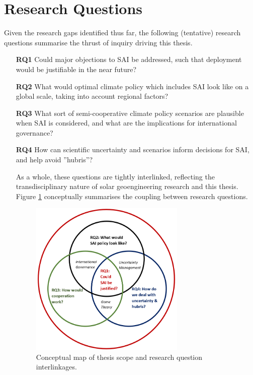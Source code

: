 \documentclass{article}
\begin{document}
\section*{Research Questions}
Given the research gaps identified thus far, the following (tentative) research questions summarise the thrust of inquiry driving this thesis.
\begin{enumerate}
\item[\textbf{RQ1}] Could major objections to SAI be addressed, such that deployment would be justifiable in the near future?
\item[\textbf{RQ2}] What would optimal climate policy which includes SAI look like on a global scale, taking into account regional factors?
\item[\textbf{RQ3}] What sort of semi-cooperative climate policy scenarios are plausible when SAI is considered, and what are the implications for international governance?
\item[\textbf{RQ4}] How can scientific uncertainty and scenarios inform decisions for SAI, and help avoid ”hubris”?

As a whole, these questions are tightly interlinked, reflecting the transdisciplinary nature of solar geoengineering research and this thesis. Figure \ref{fig:thesisMap} conceptually summarises the coupling between research questions.
\begin{figure}[h]
    \centering
    \includegraphics[width=0.7\textwidth]{ThesisMap2.PNG}
    \caption{Conceptual map of thesis scope and research question interlinkages.}
    \label{fig:thesisMap}
\end{figure}


\end{enumerate}
\end{document}
